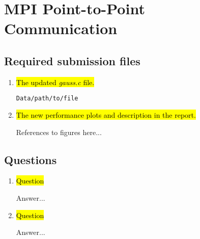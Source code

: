 \section{MPI Point-to-Point Communication}
\subsection{Required submission files}
\begin{enumerate}
	\item \hl{The updated \emph{gauss.c} file.}

		\verb!Data/path/to/file!

	\item \hl{The new performance plots and description in the report.}

		References to figures here...

\end{enumerate}

\subsection{Questions}
\begin{enumerate}
	\item \hl{Question}

	Answer...

	\item \hl{Question}

	Answer...

	
\end{enumerate}


